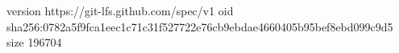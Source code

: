 version https://git-lfs.github.com/spec/v1
oid sha256:0782a5f9fca1eec1c71c31f527722e76cb9ebdae4660405b95bef8ebd099c9d5
size 196704
